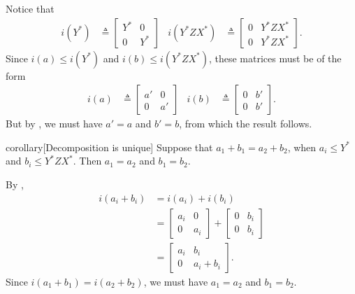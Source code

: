 \documentclass[a4paper,UKenglish,cleveref, autoref, thm-restate]{lipics-v2021}
\begin{document}
\begin{proofEnd}
  Notice that
  \begin{align*}
    i(Y^*)
    &  \triangleq 
      \begin{bmatrix}
        Y^* & 0 \\
        0 & Y^*
      \end{bmatrix}
    & i(Y^*ZX^*)
    &  \triangleq 
      \begin{bmatrix}
        0 & Y^*ZX^* \\
        0 & Y^*ZX^*
      \end{bmatrix}.
  \end{align*}
  Since $i(a)  \leq  i(Y^*)$ and $i(b)  \leq  i(Y^*ZX^*)$, these matrices must be of the
  form
  \begin{align*}
    i(a)
    &  \triangleq 
      \begin{bmatrix}
        a' & 0  \\
        0 & a'
      \end{bmatrix}
    & i(b)
    &  \triangleq 
      \begin{bmatrix}
        0 & b' \\
        0 & b'
      \end{bmatrix}.
  \end{align*}
  But by , we must have $a' = a$ and $b' = b$, from
  which the result follows.
\end{proofEnd}

\begin{theoremEnd}{corollary}[Decomposition is unique]
  Suppose that $a_1 + b_1 = a_2 + b_2$, when $a_i  \leq  Y^*$ and $b_i  \leq  Y^*ZX^*$.
  Then $a_1 = a_2$ and $b_1 = b_2$.
\end{theoremEnd}

\begin{proofEnd}
  By ,
  \begin{align*}
    i(a_i + b_i)
    & = i(a_i) + i(b_i) \\
    & =
      \begin{bmatrix}
        a_i & 0 \\
        0 & a_i
      \end{bmatrix}
      +
      \begin{bmatrix}
        0 & b_i \\
        0 & b_i
      \end{bmatrix}\\
    & =
      \begin{bmatrix}
        a_i & b_i \\
        0 & a_i+b_i
      \end{bmatrix}.
  \end{align*}
  Since $i(a_1 + b_1) = i(a_2+b_2)$, we must have $a_1 = a_2$ and $b_1 = b_2$.
\end{proofEnd}
\end{document}
